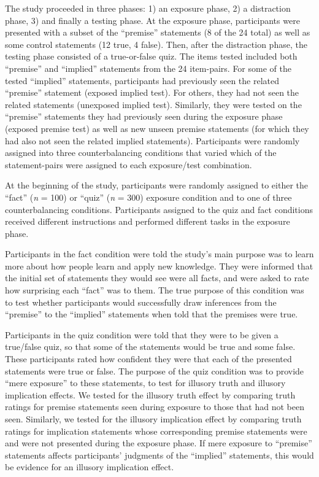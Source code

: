\documentclass[10pt, letterpaper]{article}
\begin{document}
The study proceeded in three phases: 1) an exposure phase, 2) a
distraction phase, 3) and finally a testing phase. At the exposure
phase, participants were presented with a subset of the ``premise''
statements (8 of the 24 total) as well as some control statements (12
true, 4 false). Then, after the distraction phase, the testing phase
consisted of a true-or-false quiz. The items tested included both
``premise'' and ``implied'' statements from the 24 item-pairs. For some
of the tested ``implied'' statements, participants had previously seen
the related ``premise'' statement (exposed implied test). For others,
they had not seen the related statements (unexposed implied test).
Similarly, they were tested on the ``premise'' statements they had
previously seen during the exposure phase (exposed premise test) as well
as new unseen premise statements (for which they had also not seen the
related implied statements). Participants were randomly assigned into
three counterbalancing conditions that varied which of the
statement-pairs were assigned to each exposure/test combination.

At the beginning of the study, participants were randomly assigned to
either the ``fact'' (\emph{n} = 100) or ``quiz'' (\emph{n} = 300)
exposure condition and to one of three counterbalancing conditions.
Participants assigned to the quiz and fact conditions received different
instructions and performed different tasks in the exposure phase.

Participants in the fact condition were told the study's main purpose
was to learn more about how people learn and apply new knowledge. They
were informed that the initial set of statements they would see were all
facts, and were asked to rate how surprising each ``fact'' was to them.
The true purpose of this condition was to test whether participants
would successfully draw inferences from the ``premise'' to the
``implied'' statements when told that the premises were true.

Participants in the quiz condition were told that they were to be given
a true/false quiz, so that some of the statements would be true and some
false. These participants rated how confident they were that each of the
presented statements were true or false. The purpose of the quiz
condition was to provide ``mere exposure'' to these statements, to test
for illusory truth and illusory implication effects. We tested for the
illusory truth effect by comparing truth ratings for premise statements
seen during exposure to those that had not been seen. Similarly, we
tested for the illusory implication effect by comparing truth ratings
for implication statements whose corresponding premise statements were
and were not presented during the exposure phase. If mere exposure to
``premise'' statements affects participants' judgments of the
``implied'' statements, this would be evidence for an illusory
implication effect.
\end{document}
